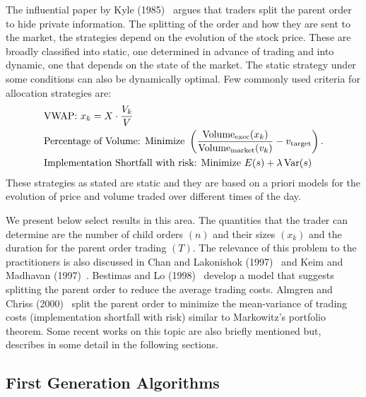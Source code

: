 The influential paper by Kyle (1985)~\cite{kyle1985} argues that traders split the parent order to hide private information. The splitting of the order and how they are sent to the market, the strategies depend on the evolution of the stock price. These are broadly classified into static, one determined in advance of trading and into dynamic, one that depends on the state of the market. The static strategy under some conditions can also be dynamically optimal. Few commonly used criteria for allocation strategies are:
	\[
	\begin{split}
	&\text{VWAP: } x_k= X \cdot \dfrac{V_k}{V} \\
	&\text{Percentage of Volume: Minimize } \left( \dfrac{\text{Volume}_{\text{exec}}(x_k)}{\text{Volume}_{\text{market}}(v_k)} - v_{\text{target}} \right). \\
	&\text{Implementation Shortfall with risk: Minimize } E(s) + \lambda \operatorname{Var}(s)
	\end{split}
	\]
These strategies as stated are static and they are based on a priori models for the evolution of price and volume traded over different times of the day. 


We present below select results in this area. The quantities that the trader can determine are the number of child orders $(n)$ and their sizes $(x_k)$ and the duration for the parent order trading $(T)$. The relevance of this problem to the practitioners is also discussed in Chan and Lakonishok (1997)~\cite{lakon} and Keim and Madhavan (1997)~\cite{madhavan}. Bestimas and Lo (1998)~\cite{berlo} develop a model that suggests splitting the parent order to reduce the average trading costs. Almgren and Chriss (2000)~\cite{alm2000} split the parent order to minimize the mean-variance of trading costs (implementation shortfall with risk) similar to Markowitz's portfolio theorem. Some recent works on this topic are also briefly mentioned but, describes in some detail in the following sections.



\subsection{First Generation Algorithms \label{sec:first_gen}}


